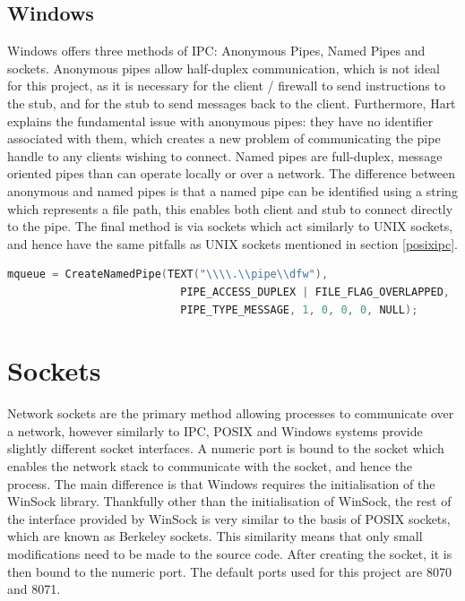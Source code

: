 \documentclass[a4paper, 11pt]{report}
\begin{document}
\subsection{Windows}
Windows\cite{windows} offers three methods of \acrshort{IPC}: Anonymous Pipes, Named Pipes and sockets. Anonymous pipes allow half-duplex communication, which is not ideal for this project, as it is necessary for the client / firewall to send instructions to the \gls{stub}, and for the \gls{stub} to send messages back to the client. Furthermore, Hart\cite{windowsprog} explains the fundamental issue with anonymous pipes: they have no identifier associated with them, which creates a new problem of communicating the pipe handle to any clients wishing to connect. Named pipes are full-duplex, message oriented pipes than can operate locally or over a network. The difference between anonymous and named pipes is that a named pipe can be identified using a string which represents a file path, this enables both client and \gls{stub} to connect directly to the pipe. The final method is via sockets which act similarly to UNIX sockets, and hence have the same pitfalls as UNIX sockets mentioned in section \ref{posixipc}.\\

\begin{lstlisting}[language=c,style=c,caption=Creating the message queue on Windows]
mqueue = CreateNamedPipe(TEXT("\\\\.\\pipe\\dfw"),
                           PIPE_ACCESS_DUPLEX | FILE_FLAG_OVERLAPPED,
                           PIPE_TYPE_MESSAGE, 1, 0, 0, 0, NULL);
\end{lstlisting}

\section{Sockets}
Network sockets are the primary method allowing processes to communicate over a network, however similarly to \acrshort{IPC}, \acrshort{POSIX} and Windows systems provide slightly different socket interfaces. A numeric port is bound to the socket which enables the network stack to communicate with the socket, and hence the process. The main difference is that Windows requires the initialisation of the WinSock\cite{winsock} library. Thankfully other than the initialisation of WinSock, the rest of the interface provided by WinSock is very similar to the basis of \acrshort{POSIX} sockets, which are known as Berkeley sockets. This similarity means that only small modifications need to be made to the source code. After creating the socket, it is then bound to the numeric port. The default ports used for this project are 8070 and 8071.
\end{document}
